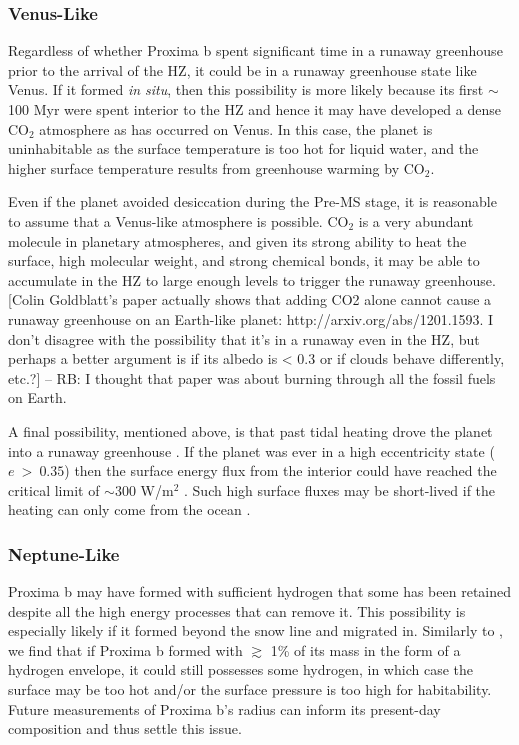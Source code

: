 \documentclass[preprint,12pt]{aastex}
\newcommand{\xxx}[1]{{\color{red} #1}} %
\begin{document}
\subsubsection{Venus-Like}
\label{sec:results:atmstates:venuslike}


Regardless of whether Proxima b spent significant time in a runaway
greenhouse prior to the arrival of the HZ, it could be in a runaway
greenhouse state like Venus. If it formed {\it in situ}, then this
possibility is more likely because its first $\sim$100 Myr were spent
interior to the HZ and hence it may have developed a dense CO$_2$
atmosphere as has occurred on Venus. In this case, the planet is
uninhabitable as the surface temperature is too hot for liquid water,
and the higher surface temperature results from greenhouse warming by
CO$_2$.

Even if the planet avoided desiccation during the Pre-MS stage, it is
reasonable to assume that a Venus-like atmosphere is possible. CO$_2$
is a very abundant molecule in planetary atmospheres, and given its
strong ability to heat \xxx{the} surface, high molecular weight, and strong
chemical bonds, it may be able to accumulate in the HZ to large enough
levels to trigger the runaway greenhouse. \xxx{[Colin Goldblatt's
paper actually shows that adding CO2 alone cannot cause a runaway
greenhouse on an Earth-like planet: http://arxiv.org/abs/1201.1593.
I don't disagree with the possibility that it's in a runaway even in 
the HZ, but perhaps a better argument is if its albedo is < 0.3 or if
clouds behave differently, etc.?] -- RB: I thought that paper was about burning through all the fossil fuels on Earth.}

A final possibility, mentioned above, is that past tidal heating drove
the planet into a runaway greenhouse \citep{Barnes13}. If the planet
was ever in a high eccentricity state ($e~>~0.35$) then the surface
energy flux from the interior could have reached the critical limit of
$\sim$300 W/m$^2$ \citep{Kasting93,Abe93,Goldblatt15}. Such high
surface fluxes may be short-lived if the heating can only come from
the ocean \citep{DriscollBarnes15}.

\subsubsection{Neptune-Like}
\label{sec:results:atmstates:neptunelike}

Proxima b may have formed with sufficient hydrogen that some has been
retained despite all the high energy processes that can remove
it. This possibility is especially likely if it formed beyond the snow
line and migrated in. Similarly to \cite{OwenMohanty16}, we find that
if Proxima b formed with $\gtrsim$ 1\% of its mass in the form of a
hydrogen envelope, it could still possesses some hydrogen, in which
case the surface may be too hot and/or the surface pressure is too
high for habitability.  Future measurements of Proxima b's radius can
inform its present-day composition and thus settle this issue.
\end{document}
